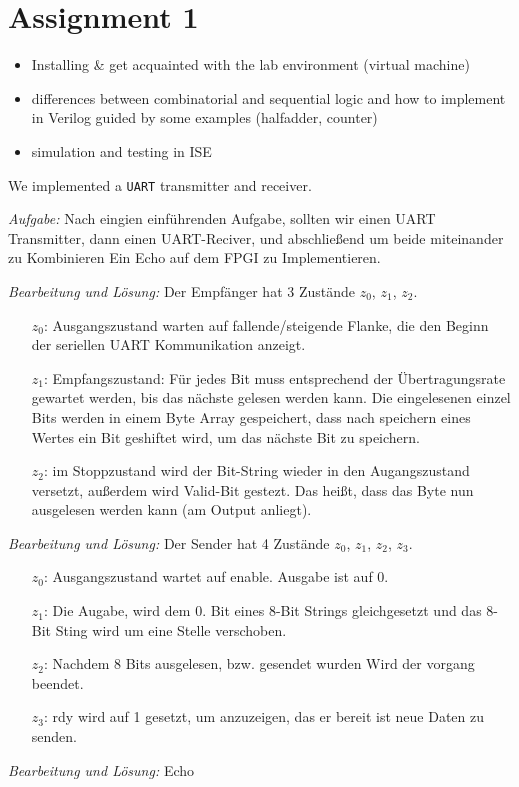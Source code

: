 \section*{Assignment 1}
\begin{itemize}
    \item Installing \& get acquainted with the lab environment (virtual machine)
    \item differences between combinatorial and sequential logic and how to implement in Verilog guided by some examples (halfadder, counter)
    \item simulation and testing in ISE
\end{itemize}

We implemented a \texttt{UART} transmitter and receiver.

\emph{Aufgabe: }Nach eingien einführenden Aufgabe, sollten wir einen UART Transmitter, dann einen UART-Reciver, und abschließend um beide miteinander zu Kombinieren Ein Echo auf dem FPGI zu Implementieren.


\emph{Bearbeitung und Lösung: }Der Empfänger hat 3 Zustände $z_0$, $z_1$, $z_2$.\begin{itemize}


\item[$z_0$:] Ausgangszustand warten auf fallende/steigende Flanke, die den Beginn der seriellen UART Kommunikation anzeigt.
\item[$z_1$:] Empfangszustand: Für jedes Bit muss entsprechend der Übertragungsrate gewartet werden, bis das nächste gelesen werden kann. Die eingelesenen einzel Bits werden in einem Byte Array gespeichert, dass nach speichern eines Wertes ein Bit geshiftet wird, um das nächste Bit zu speichern. 
\item[$z_2$:] im Stoppzustand wird der Bit-String wieder in den Augangszustand versetzt, außerdem wird Valid-Bit gestezt. Das heißt, dass das Byte nun ausgelesen werden kann (am Output anliegt). 
\end{itemize}

\emph{Bearbeitung und Lösung: }Der Sender hat 4 Zustände $z_0$, $z_1$, $z_2$, $z_3$.\begin{itemize}


\item[$z_0$:] Ausgangszustand wartet auf enable. Ausgabe ist auf 0.
\item[$z_1$:] Die Augabe, wird dem 0. Bit eines 8-Bit Strings gleichgesetzt und das 8-Bit Sting wird um eine Stelle verschoben.
\item[$z_2$:] Nachdem 8 Bits ausgelesen, bzw. gesendet wurden Wird der vorgang beendet.
\item[$z_3$:] rdy wird auf 1 gesetzt, um anzuzeigen, das er bereit ist neue Daten zu senden.  

\end{itemize}

\emph{Bearbeitung und Lösung: } Echo 
